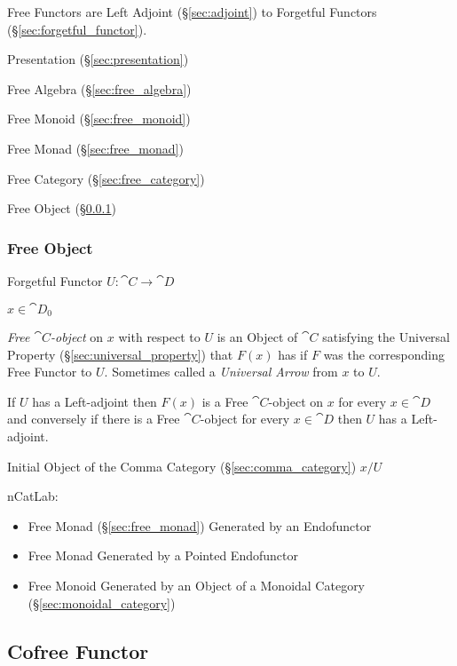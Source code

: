 Free Functors are Left Adjoint (\S\ref{sec:adjoint}) to Forgetful
Functors (\S\ref{sec:forgetful_functor}).

Presentation (\S\ref{sec:presentation})

Free Algebra (\S\ref{sec:free_algebra})

Free Monoid (\S\ref{sec:free_monoid})

Free Monad (\S\ref{sec:free_monad})

Free Category (\S\ref{sec:free_category})

Free Object (\S\ref{sec:free_object})



\subsubsection{Free Object}\label{sec:free_object}

Forgetful Functor $U : \cat{C} \rightarrow \cat{D}$

$x \in \cat{D}_0$

\emph{Free $\cat{C}$-object} on $x$ with respect to $U$ is an Object
of $\cat{C}$ satisfying the Universal Property
(\S\ref{sec:universal_property}) that $F(x)$ has if $F$ was the
corresponding Free Functor to $U$. Sometimes called a \emph{Universal
  Arrow} from $x$ to $U$.

If $U$ has a Left-adjoint then $F(x)$ is a Free $\cat{C}$-object on
$x$ for every $x \in \cat{D}$ and conversely if there is a Free
$\cat{C}$-object for every $x \in \cat{D}$ then $U$ has a
Left-adjoint.

Initial Object of the Comma Category (\S\ref{sec:comma_category}) $x /
U$

nCatLab:

\begin{itemize}
  \item Free Monad (\S\ref{sec:free_monad}) Generated by an Endofunctor
  \item Free Monad Generated by a Pointed Endofunctor
  \item Free Monoid Generated by an Object of a Monoidal Category
    (\S\ref{sec:monoidal_category})
\end{itemize}



\subsection{Cofree Functor}\label{sec:cofree_functor}

